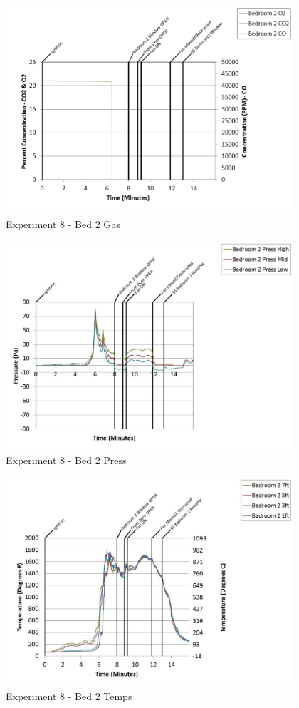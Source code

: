 \documentclass{article}
\begin{document}
\begin{appendices}
	\clearpage

	\begin{figure}[h!]
		\centering
		\includegraphics[height=3.05in]{0_Images/Results_Charts/Exp_8_Charts/Bed2Gas.pdf}
		\caption{Experiment 8 - Bed 2 Gas}
	\end{figure}
 

	\begin{figure}[h!]
		\centering
		\includegraphics[height=3.05in]{0_Images/Results_Charts/Exp_8_Charts/Bed2Press.pdf}
		\caption{Experiment 8 - Bed 2 Press}
	\end{figure}
 
	\clearpage

	\begin{figure}[h!]
		\centering
		\includegraphics[height=3.05in]{0_Images/Results_Charts/Exp_8_Charts/Bed2Temps.pdf}
		\caption{Experiment 8 - Bed 2 Temps}
	\end{figure}
 


\end{appendices}
\end{document}
